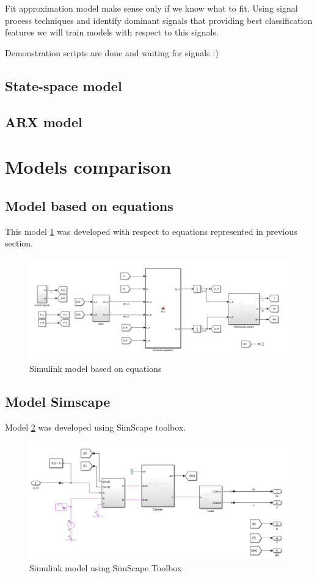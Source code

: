 \documentclass[class=article, crop=false]{standalone}
\begin{document}
Fit approximation model make sense only if we know what to fit. Using
signal process techniques and identify dominant signals that providing best
classification features we will train models with respect to this signals.

Demonstration scripts are done and waiting for signals :)

\subsection{State-space model}
\subsection{ARX model}

\pagebreak
\section{Models comparison}

\subsection{Model based on equations}
This model \ref{fig:model_equations} was developed with respect to equations represented in previous
section.

\begin{figure}[h!]
    \centering
    \includegraphics[width=1\textwidth]{equations.png}
    \caption{Simulink model based on equations}
    \label{fig:model_equations}
\end{figure}


\subsection{Model Simscape}
Model \ref{fig:model_simscape} was developed using SimScape toolbox.

\begin{figure}[h!]
    \centering
    \includegraphics[width=1\textwidth]{simscape.png}
    \caption{Simulink model using SimScape Toolbox}
    \label{fig:model_simscape}
\end{figure}
\end{document}
